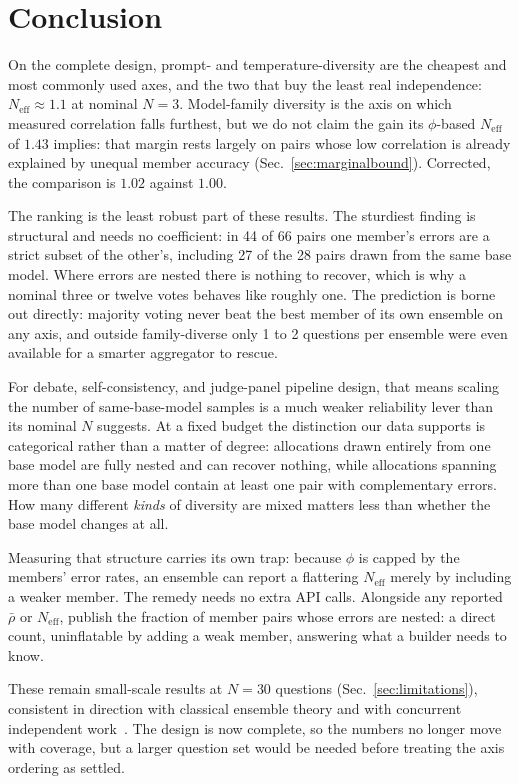 \documentclass[conference]{IEEEtran}
\begin{document}
\section{Conclusion}
On the complete design, prompt- and temperature-diversity are the cheapest
and most commonly used axes, and the two that buy the least real
independence: $N_\text{eff}\approx 1.1$ at nominal $N=3$. Model-family
diversity is the axis on which measured correlation falls furthest, but we do
not claim the gain its $\phi$-based $N_\text{eff}$ of $1.43$ implies: that
margin rests largely on pairs whose low correlation is already explained by
unequal member accuracy (Sec.~\ref{sec:marginalbound}). Corrected, the
comparison is $1.02$ against $1.00$.

The ranking is the least robust part of these results. The sturdiest finding
is structural and needs no coefficient: in 44 of 66 pairs one member's errors
are a strict subset of the other's, including 27 of the 28 pairs drawn from
the same base model. Where errors are nested there is nothing to recover,
which is why a nominal three or twelve votes behaves like roughly one. The
prediction is borne out directly: majority voting never beat the best member
of its own ensemble on any axis, and outside family-diverse only 1 to 2
questions per ensemble were even available for a smarter aggregator to
rescue.

For debate, self-consistency, and judge-panel pipeline design, that means
scaling the number of same-base-model samples is a much weaker reliability
lever than its nominal $N$ suggests. At a fixed budget the distinction our
data supports is categorical rather than a matter of degree: allocations
drawn entirely from one base model are fully nested and can recover nothing,
while allocations spanning more than one base model contain at least one
pair with complementary errors. How many different \emph{kinds} of diversity
are mixed matters less than whether the base model changes at all.

Measuring that structure carries its own trap: because $\phi$ is capped by
the members' error rates, an ensemble can report a flattering $N_\text{eff}$
merely by including a weaker member. The remedy needs no extra API calls.
Alongside any reported $\bar\rho$ or $N_\text{eff}$, publish the fraction of
member pairs whose errors are nested: a direct count, uninflatable by adding
a weak member, answering what a builder needs to know.

These remain small-scale results at $N=30$ questions
(Sec.~\ref{sec:limitations}), consistent in direction with classical ensemble
theory and with concurrent independent
work~\cite{kim2026diversitymetrics,ding2026agreement}. The design is now
complete, so the numbers no longer move with coverage, but a larger question
set would be needed before treating the axis ordering as settled.
\end{document}
